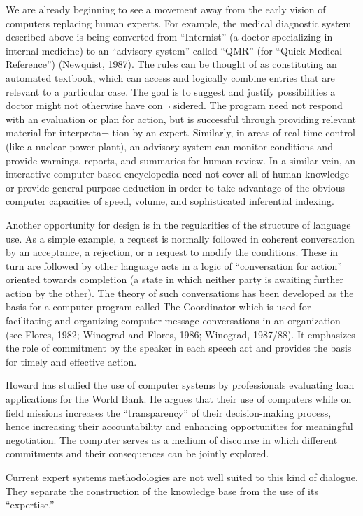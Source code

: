 \documentclass[12pt]{article}
\begin{document}
We are already beginning to see a movement away from the early vision of computers replacing human experts. For example, the medical diagnostic system described above is being converted from “Internist” (a doctor specializing in internal medicine) to an “advisory system” called “QMR” (for “Quick Medical Reference”) (Newquist, 1987). The rules can be thought of as constituting an automated textbook, which can access and logically combine entries that are relevant to a particular case. The goal is to suggest and justify possibilities a doctor might not otherwise have con¬ sidered. The program need not respond with an evaluation or plan for action, but is successful through providing relevant material for interpreta¬ tion by an expert. Similarly, in areas of real-time control (like a nuclear power plant), an advisory system can monitor conditions and provide warnings, reports, and summaries for human review. In a similar vein, an interactive computer-based encyclopedia need not cover all of human knowledge or provide general purpose deduction in order to take advantage of the obvious computer capacities of speed, volume, and sophisticated inferential indexing.

Another opportunity for design is in the regularities of the structure of language use. As a simple example, a request is normally followed in coherent conversation by an acceptance, a rejection, or a request to modify the conditions. These in turn are followed by other language acts in a logic of “conversation for action” oriented towards completion (a state in which neither party is awaiting further action by the other). The theory of such conversations has been developed as the basis for a computer program called The Coordinator which is used for facilitating and organizing computer-message conversations in an organization (see Flores, 1982; Winograd and Flores, 1986; Winograd, 1987/88). It emphasizes the role of commitment by the speaker in each speech act and provides the basis for timely and effective action.

Howard has studied the use of computer systems by professionals evaluating loan applications for the World Bank. He argues that their use of computers while on field missions increases the “transparency” of their decision-making process, hence increasing their accountability and enhancing opportunities for meaningful negotiation. The computer serves as a medium of discourse in which different commitments and their consequences can be jointly explored.

Current expert systems methodologies are not well suited to this kind of dialogue. They separate the construction of the knowledge base from the use of its “expertise.”
\end{document}
